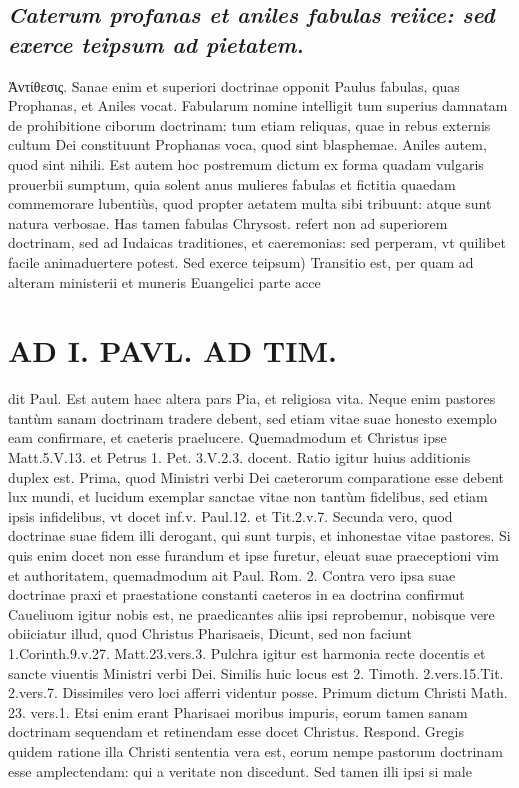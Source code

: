 \documentclass{article}
\begin{document}
\begin{pages}
\subsection*{\textit{Caterum profanas et aniles fabulas reiice: sed exerce teipsum ad pietatem. }}\pstart Ἀντίθεσις. Sanae enim et superiori doctrinae opponit Paulus fabulas, quas Prophanas, et Aniles vocat. Fabularum nomine intelligit tum superius damnatam de prohibitione ciborum doctrinam: tum etiam reliquas, quae in rebus externis cultum Dei constituunt Prophanas voca, quod sint blasphemae. Aniles autem, quod sint nihili. Est autem hoc postremum dictum ex forma quadam vulgaris prouerbii sumptum, quia solent anus mulieres fabulas et fictitia quaedam commemorare lubentiùs, quod propter aetatem multa sibi tribuunt: atque sunt natura verbosae. Has tamen fabulas Chrysost. refert non ad superiorem doctrinam, sed ad Iudaicas traditiones, et caeremonias: sed perperam, vt quilibet facile animaduertere potest.  \pend\pstart Sed exerce teipsum) Transitio est, per quam ad alteram ministerii et muneris Euangelici parte acce  \pend
\section*{AD I. PAVL. AD TIM. }
\marginpar{[ p.204 ]}\pstart dit Paul. Est autem haec altera pars Pia, et religiosa vita. Neque enim pastores tantùm sanam doctrinam tradere debent, sed etiam vitae suae honesto exemplo eam confirmare, et caeteris praelucere. Quemadmodum et Christus ipse Matt.5.V.13. et Petrus 1. Pet. 3.V.2.3. docent. Ratio igitur huius additionis duplex est. Prima, quod Ministri verbi Dei caeterorum comparatione esse debent lux mundi, et lucidum exemplar sanctae vitae non tantùm fidelibus, sed etiam ipsis infidelibus, vt docet inf.v. Paul.12. et Tit.2.v.7. Secunda vero, quod doctrinae suae fidem illi derogant, qui sunt turpis, et inhonestae vitae pastores. Si quis enim docet non esse furandum et ipse furetur, eleuat suae praeceptioni vim et authoritatem, quemadmodum ait Paul. Rom. 2. Contra vero ipsa suae doctrinae praxi et praestatione constanti caeteros in ea doctrina confirmut Caueliuom igitur nobis est, ne praedicantes aliis ipsi reprobemur, nobisque vere obiiciatur illud, quod Christus Pharisaeis, Dicunt, sed non faciunt 1.Corinth.9.v.27. Matt.23.vers.3. Pulchra igitur est harmonia recte docentis et sancte viuentis Ministri verbi Dei.  \pend\pstart Similis huic locus est 2. Timoth. 2.vers.15.Tit. 2.vers.7.  \pend\pstart Dissimiles vero loci afferri videntur posse. Primum dictum Christi Math. 23. vers.1. Etsi enim erant Pharisaei moribus impuris, eorum tamen sanam doctrinam sequendam et retinendam esse docet Christus. Respond. Gregis quidem ratione illa Christi sententia vera est, eorum nempe pastorum doctrinam esse amplectendam: qui a veritate non discedunt. Sed tamen illi ipsi si male  \pend

\end{pages}
\end{document}
